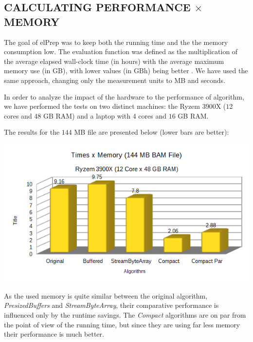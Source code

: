 \documentclass[a4paper,twoside]{article}
\begin{document}




 
 
\subsection{\uppercase{Calculating performance $\times$ memory}} \label{subsec:uppercase7}
The goal of elPrep was to keep both the running time and the the memory consumption low. The evaluation function was defined as the multiplication of the average elapsed wall-clock time (in hours) with the average maximum memory use (in GB), with lower values (in GBh) being better \cite{costanza:2019}.
We have used the same approach, changing only the measurement units to MB and seconds.

In order to analyze the impact of the hardware to the performance of algorithm, we have performed the tests on two distinct machines: the Ryzem 3900X ($1$2 cores and $48$ GB RAM) and a laptop with $4$ cores and $16$ GB RAM.

The results for the $144$ MB file are presented below (lower bars are better):
\begin{center}
	\includegraphics[scale=0.5]{images/times_and_memory_chart_small_144mb_ryzen.png}
\end{center}

As the used memory is quite similar between the original algorithm, {\it PresizedBuffers} and {\it StreamByteArray}, their comparative performance is influenced only by the runtime savings. 
The {\it Compact} algorithms are on par from the point of view of the running time, but since they are using far less memory their performance is much better.
\end{document}
